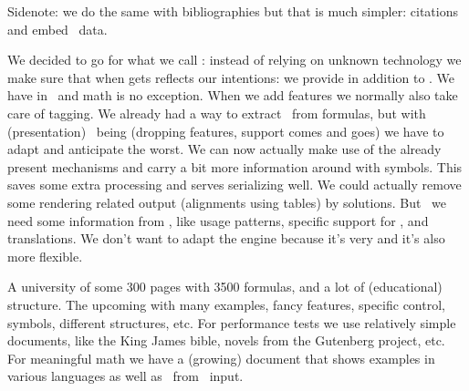 \vfilll %

\startitem
    Sidenote: we do the same with bibliographies but that is much simpler:
     citations and embed \BIBTEX\ data.
\stopitem
\stopitemize

\stoptitle

\starttitle[title=How]

\startitemize
\startitem
    We decided to go for what we call : instead of
    relying on unknown technology we make sure that when gets 
    reflects our intentions: we provide  in addition to
    .
\stopitem
\startitem
    We have  in \CONTEXT\ and math is no
    exception. When we add features we normally also take care of tagging.
\stopitem
\startitem
    We already had a way to extract \MATHML\ from formulas, but with
    (presentation) \MATHML\ being  (dropping features,
    support comes and goes) we have to adapt and anticipate the worst.
\stopitem
\startitem
    We can now actually make use of the already present 
    mechanisms and carry a bit more information around with symbols. This saves
    some extra processing and serves serializing well.
\stopitem
\startitem
    We could actually remove some rendering related output (alignments using
    tables) by  solutions.
\stopitem
\startitem
    But \unknown\ we need some information from , like usage
    patterns, specific support for , and translations.
\stopitem
\startitem
    We don't want to adapt the engine because it's very  and it's also more flexible.
\stopitem
\stopitemize

\stoptitle

\starttitle[title=Tests]

\startitemize
\startitem
    A university  of some 300 pages with 3500 formulas, and a lot
    of (educational) structure.
\stopitem
\startitem
    The upcoming  with many examples, fancy features,
    specific control, symbols, different structures, etc.
\stopitem
\startitem
    For performance tests we use relatively simple 
    documents, like the King James bible, novels from the Gutenberg project, etc.
\stopitem
\startitem
    For meaningful math we have a (growing) document that shows \notabene
    {examples in various languages} as well as \MATHML\ from \CONTEXT\ input.
\stopitem
\stopitemize

